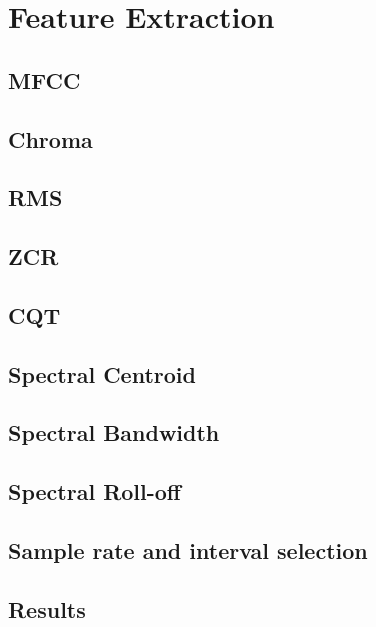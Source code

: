 \section{Feature Extraction}


\subsection{MFCC}
\subsection{Chroma}
\subsection{RMS}
\subsection{ZCR}
\subsection{CQT}
\subsection{Spectral Centroid}
\subsection{Spectral Bandwidth}
\subsection{Spectral Roll-off}

\subsection{Sample rate and interval selection}

\subsection{Results}

